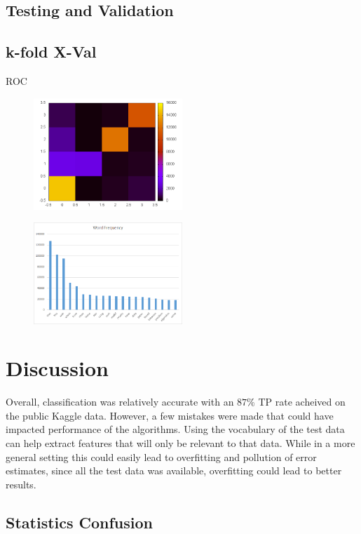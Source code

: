 \documentclass[10pt,twocolumn]{article}
\begin{document}
\subsection{Testing and Validation}

\subsection*{k-fold X-Val}

ROC
\begin{figure}
  \centering
  \includegraphics[width=0.5\textwidth]{./confusion.png}
  \label{confusion}
\end{figure}
\begin{figure}
  \centering
  \includegraphics[width=0.5\textwidth]{./word_frequency.png}
  \label{freq}
\end{figure}
\section*{Discussion}

Overall, classification was relatively accurate with an $87\%$ TP rate acheived on the public Kaggle data. However, a few mistakes were made that could have impacted performance of the algorithms. Using the vocabulary of the test data can help extract features that will only be relevant to that data.  While in a more general setting this could easily lead to overfitting and pollution of error estimates, since all the test data was available, overfitting could lead to better results. 

\subsection*{Statistics Confusion}
\end{document}
